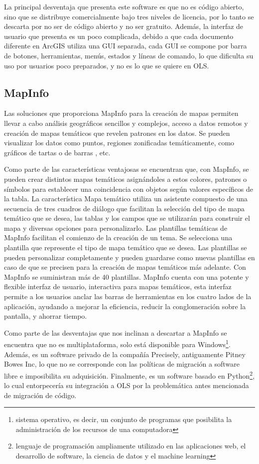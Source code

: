 La principal desventaja que presenta este software es que no es c\'odigo abierto, sino que se distribuye comercialmente bajo tres niveles de licencia, por lo tanto se descarta por no ser de c\'odigo abierto y no ser gratuito. Adem\'as, la interfaz de usuario que presenta es un poco complicada, debido a que cada documento diferente en ArcGIS utiliza una GUI separada, cada GUI se compone por barra de botones, herramientas, men\'us, estados y l\'ineas de comando, lo que dificulta su uso por usuarios poco preparados, y no es lo que se quiere en OLS.


\subsection{MapInfo}
Las soluciones que proporciona MapInfo \cite{mapinfo} para la creaci\'on de mapas permiten llevar a cabo an\'alisis geogr\'aficos sencillos y complejos, acceso a datos remotos y creaci\'on de mapas tem\'aticos que revelen patrones en los datos. Se pueden visualizar los datos como puntos, regiones zonificadas tem\'aticamente, como gr\'aficos de tartas o de barras , etc.

Como parte de las caracter\'isticas ventajosas se encuentran que, con MapInfo, se pueden crear distintos mapas tem\'aticos asign\'andoles a estos colores, patrones o s\'imbolos para establecer una coincidencia con objetos seg\'un valores espec\'ificos de la tabla. La caracter\'istica Mapa tem\'atico utiliza un asistente compuesto de una secuencia de tres cuadros de di\'alogo que facilitan la selecci\'on del tipo de mapa tem\'atico que se desea, las tablas y los campos que se utilizar\'an para construir el mapa y diversas opciones para personalizarlo. Las plantillas tem\'aticas de MapInfo facilitan el comienzo de la creaci\'on de un tema. Se selecciona una plantilla que represente el tipo de mapa tem\'atico que se desea. Las plantillas se pueden personalizar completamente y pueden guardarse como nuevas plantillas en caso de que se precisen para la creaci\'on de mapas tem\'aticos m\'as adelante. Con MapInfo se suministran m\'as de 40 plantillas. MapInfo cuenta con una potente y flexible interfaz de usuario, interactiva para mapas tem\'aticos, esta interfaz permite a los usuarios anclar las barras de herramientas en los cuatro lados de la aplicaci\'on, ayudando a mejorar la eficiencia, reducir la conglomeraci\'on sobre la pantalla, y ahorrar tiempo. \cite{mapinfo}

Como parte de las desventajas que nos inclinan a descartar a MapInfo se encuentra que no es multiplataforma, solo est\'a disponible para Windows\footnote{sistema operativo, es decir, un conjunto de programas que posibilita la administraci\'on de los recursos de una computadora}. Adem\'as, es un software privado de la compa\~n\'ia Precisely, antiguamente Pitney Bowes Inc, lo que no se corresponde con las pol\'iticas de migraci\'on a software libre e imposibilita su adquisici\'on. Finalmente, es un software basado en Python\footnote{lenguaje de programaci\'on ampliamente utilizado en las aplicaciones web, el desarrollo de software, la ciencia de datos y el machine learning}, lo cual entorpecer\'ia su integraci\'on a OLS por la problem\'atica antes mencionada de migraci\'on de c\'odigo.


